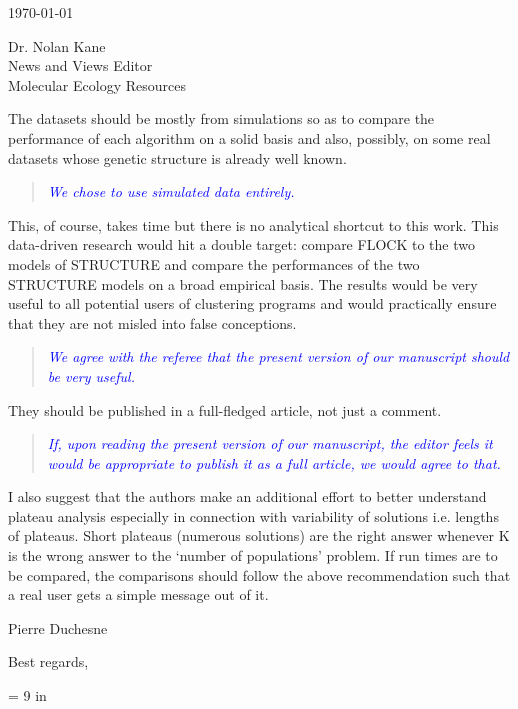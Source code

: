\documentclass[11pt]{letter}
\newcommand{\reply}[1]{\begin{quotation}\small\sl\textcolor{blue}{#1}\end{quotation}}
\begin{document}
\begin{letter}{ \today 

Dr. Nolan Kane\\
News and Views Editor\\
Molecular Ecology Resources \\
}
The datasets should be mostly
from simulations so as to compare the performance of each algorithm on a solid basis and also, possibly, on some real datasets whose genetic structure is already well known. 

\reply{We chose to use simulated data entirely.}

This, of course, takes time but there is no analytical shortcut to this work. This data-driven research would hit a double target: compare FLOCK to the two models of STRUCTURE and compare the performances of the two STRUCTURE models on a broad empirical basis. The results would be very useful to all potential users of clustering programs and would practically ensure that they are not misled into false conceptions. 

\reply{We agree with the referee that the present version of our manuscript should be very useful.}

They should be published in a full-fledged article, not just a comment. 

\reply{If, upon reading the present version of our manuscript, the editor feels it would be appropriate
to publish it as a full article, we would agree to that.
}


I also suggest that the authors make an additional effort to better understand plateau analysis especially in connection with variability of solutions i.e. lengths of plateaus. Short plateaus (numerous solutions) are the right answer whenever K is the wrong answer to the `number of populations' problem. If run times are to be compared, the comparisons should follow the above recommendation such that a real user gets a simple message out of it.


Pierre Duchesne

\closing{Best regards,}
\setlength{\topmargin}{0in}
\textheight = 9 in
\end{letter}

 
\end{document}
